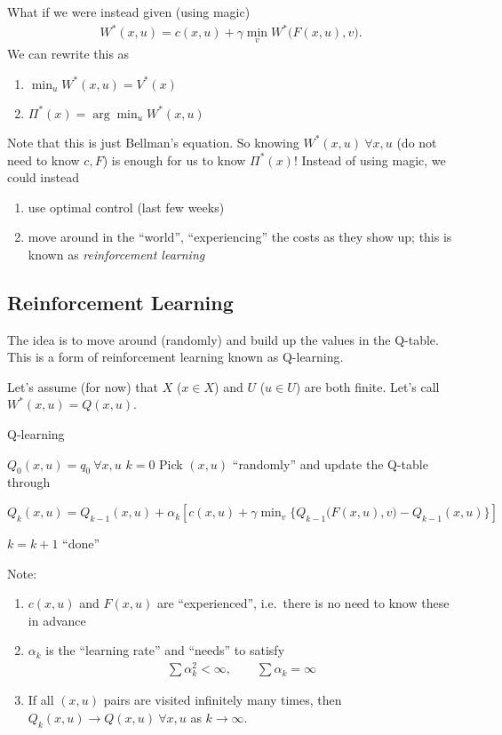 What if we were instead given (using magic)
\begin{gather}
  W^*(x,u) = c(x,u) + \gamma \min_v W^*\big(F(x,u),v\big).
\end{gather}
We can rewrite this as
\begin{enumerate}
\item $\min_u W^*(x,u)=V^*(x)$
\item $\Pi^*(x) = \arg\min_u W^*(x,u)$
\end{enumerate}
Note that this is just Bellman's equation. So knowing $W^*(x,u)\ \forall x,u$ (do not need to know $c,F$) is enough for us to know $\Pi^*(x)$! Instead of using magic, we could instead
\begin{enumerate}[nosep]
\item use optimal control (last few weeks)
\item move around in the ``world'', ``experiencing'' the costs as they show up; this is known as \emph{reinforcement learning}
\end{enumerate}

\subsection{Reinforcement Learning}
The idea is to move around (randomly) and build up the values in the Q-table. This is a form of reinforcement learning known as Q-learning.

Let's assume (for now) that $X$ ($x\in X$) and $U$ ($u\in U$) are both finite. Let's call $W^*(x,u)=Q(x,u)$.

\begin{algorithm}[H]
  \caption{Q-learning}
  \begin{algorithmic}
    \State $Q_0(x,u)=q_0\ \forall x,u$
    \State $k=0$
    \Repeat
    \State Pick $(x,u)$ ``randomly'' and update the Q-table through

    \hspace{0.5cm} $ Q_k(x,u) = Q_{k-1}(x,u) + \alpha_k \left[ c(x,u) + \gamma \min_v \Big\{ Q_{k-1} \big(F(x,u),v\big) - Q_{k-1}(x,u) \Big\} \right] $

    \State $k=k+1$
    \Until ``done''
  \end{algorithmic}
\end{algorithm}

\noindent
Note:
\begin{enumerate}[nosep]
\item $c(x,u)$ and $F(x,u)$ are ``experienced'', i.e.\ there is no need to know these in advance
\item $\alpha_k$ is the ``learning rate'' and ``needs'' to satisfy
  \begin{gather}
    \sum \alpha_k^2 < \infty, \qquad \sum \alpha_k = \infty
  \end{gather}
\item If all $(x,u)$ pairs are visited infinitely many times, then $Q_k(x,u)\to Q(x,u)\ \forall x,u$ as $k\to\infty$.
\end{enumerate}

